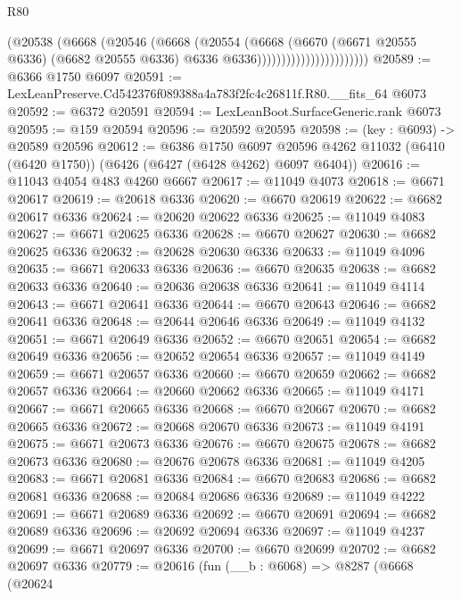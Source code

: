 \begin{lexlean}{R80}
\begin{coremodule}
                                    (@20538
                                      (@6668
                                        (@20546
                                          (@6668
                                            (@20554
                                              (@6668
                                                (@6670
                                                  (@6671 @20555 @6336)
                                                  (@6682 @20555 @6336)
                                                  @6336
                                                  @6336)))))))))))))))))))))))
@20589 := @6366 @1750 @6097
@20591 := LexLeanPreserve.Cd542376f089388a4a783f2fc4c26811f.R80.__fits_64 @6073
@20592 := @6372 @20591
@20594 := LexLeanBoot.SurfaceGeneric.rank @6073
@20595 := @159 @20594
@20596 := @20592 @20595
@20598 := (key : @6093) -> @20589 @20596
@20612 := @6386
    @1750
    @6097
    @20596
    @4262
    @11032
    (@6410 (@6420 @1750))
    (@6426 (@6427 (@6428 @4262) @6097 @6404))
@20616 := @11043 @4054 @483 @4260 @6667
@20617 := @11049 @4073
@20618 := @6671 @20617
@20619 := @20618 @6336
@20620 := @6670 @20619
@20622 := @6682 @20617 @6336
@20624 := @20620 @20622 @6336
@20625 := @11049 @4083
@20627 := @6671 @20625 @6336
@20628 := @6670 @20627
@20630 := @6682 @20625 @6336
@20632 := @20628 @20630 @6336
@20633 := @11049 @4096
@20635 := @6671 @20633 @6336
@20636 := @6670 @20635
@20638 := @6682 @20633 @6336
@20640 := @20636 @20638 @6336
@20641 := @11049 @4114
@20643 := @6671 @20641 @6336
@20644 := @6670 @20643
@20646 := @6682 @20641 @6336
@20648 := @20644 @20646 @6336
@20649 := @11049 @4132
@20651 := @6671 @20649 @6336
@20652 := @6670 @20651
@20654 := @6682 @20649 @6336
@20656 := @20652 @20654 @6336
@20657 := @11049 @4149
@20659 := @6671 @20657 @6336
@20660 := @6670 @20659
@20662 := @6682 @20657 @6336
@20664 := @20660 @20662 @6336
@20665 := @11049 @4171
@20667 := @6671 @20665 @6336
@20668 := @6670 @20667
@20670 := @6682 @20665 @6336
@20672 := @20668 @20670 @6336
@20673 := @11049 @4191
@20675 := @6671 @20673 @6336
@20676 := @6670 @20675
@20678 := @6682 @20673 @6336
@20680 := @20676 @20678 @6336
@20681 := @11049 @4205
@20683 := @6671 @20681 @6336
@20684 := @6670 @20683
@20686 := @6682 @20681 @6336
@20688 := @20684 @20686 @6336
@20689 := @11049 @4222
@20691 := @6671 @20689 @6336
@20692 := @6670 @20691
@20694 := @6682 @20689 @6336
@20696 := @20692 @20694 @6336
@20697 := @11049 @4237
@20699 := @6671 @20697 @6336
@20700 := @6670 @20699
@20702 := @6682 @20697 @6336
@20779 := @20616
    (fun (__b : @6068) =>
    @8287
      (@6668
        (@20624

\end{coremodule}
\end{lexlean}
